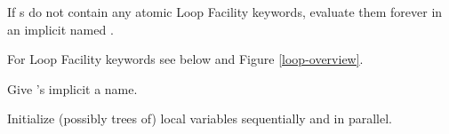 \begin{LIST}{1cm}

  {
     If s do not contain any atomic Loop
    Facility keywords, evaluate them forever in an implicit 
    named \NIL.
  }

  {
     For Loop Facility keywords
    see below and Figure \ref{loop-overview}.
  }

  \begin{LIST}{.5cm}
    
    {
      Give 's implicit  a name.
    }

    {
      Initialize (possibly trees of) local variables 
      sequentially and  in parallel. 
    }


\end{LIST}
\end{LIST}
